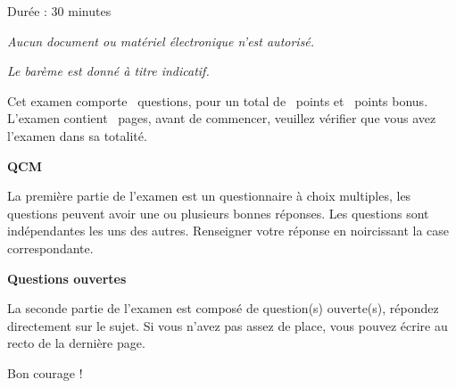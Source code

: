 	\vspace*{2cm}

\begin{center}
	
	Durée : 30 minutes
	
	\textit{Aucun document ou matériel électronique n’est autorisé.}
	
	\textit{Le barème est donné à titre indicatif.}
\end{center}

\vspace{1.5cm}
\vspace{1.5cm}


\begin{center}
	Cet examen comporte \numquestions\ questions, pour un total de \numpoints\ points et \numbonuspoints\ points bonus. L'examen contient \numpages\ pages, avant de commencer, veuillez vérifier que vous avez l'examen dans sa totalité.
\end{center}

\vspace{1.5cm}

\textbf{QCM}

La première partie de l'examen est un questionnaire à choix multiples, les questions peuvent avoir une ou plusieurs bonnes réponses. Les questions sont indépendantes les uns des autres. Renseigner votre réponse en noircissant la case correspondante.

\vspace{1.5cm}

\textbf{Questions ouvertes}

La seconde partie de l'examen est composé de question(s) ouverte(s), répondez directement sur le sujet. Si vous n'avez pas assez de place, vous pouvez écrire au recto de la dernière page.

\vspace{1.5cm}

\begin{center}
	Bon courage ! \blacksmiley{}
\end{center}

\newpage

\begin{center}
	\gradetable
\end{center}
